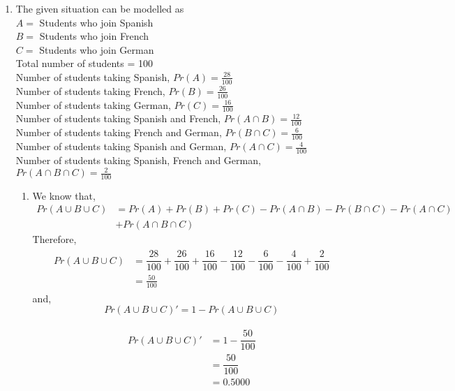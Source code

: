 \documentclass{article}
\begin{document}
	
	\begin{enumerate}
		\item \large The given situation can be modelled as\\
		$A = $ Students who join Spanish\\
		$B = $ Students who join French\\
		$C = $ Students who join German\\
		
		Total number of students = 100\\
		Number of students taking Spanish, $Pr(A) = \frac{28}{100}$\\
		Number of students taking French, $Pr(B) = \frac{26}{100}$\\
		Number of students taking German, $Pr(C) = \frac{16}{100}$\\
		Number of students taking Spanish and French, $Pr(A \cap B) = \frac{12}{100}$\\
		Number of students taking French and German, $Pr(B \cap C) = \frac{6}{100}$\\
		Number of students taking Spanish and German, $Pr(A \cap C) = \frac{4}{100}$\\
		Number of students taking Spanish, French and German, $Pr(A \cap B \cap C) = \frac{2}{100}$
		
		
		\begin{enumerate}
			\item We know that, 
			\begin{align*}
			Pr(A \cup B \cup C) &= Pr(A) + Pr(B) + Pr(C) - Pr(A \cap B) - Pr(B \cap C) - Pr(A \cap C)\\& + Pr(A \cap B \cap C)
			\end{align*}
			Therefore,
			\begin{align*}
				\begin{split}
					Pr(A \cup B \cup C) &= \dfrac{28}{100} + \dfrac{26}{100} + \dfrac{16}{100} - \dfrac{12}{100} - \dfrac{6}{100} - \dfrac{4}{100} + \dfrac{2}{100}\\
					&= \frac{50}{100}
				\end{split}
			\end{align*}
			and, 
			\[\boxed{Pr(A \cup B \cup C)' = 1 - Pr(A \cup B \cup C)} \]
			
			\begin{align*}
				\begin{split}
					Pr(A \cup B \cup C)' &= 1 - \dfrac{50}{100}\\
					&= \dfrac{50}{100}\\
					&= \mathbf{0.5000}
				\end{split}
			\end{align*}
			

\end{enumerate}
\end{enumerate}
\end{document}
